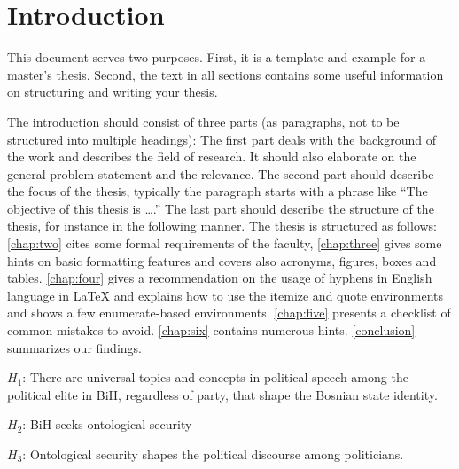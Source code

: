 \chapter{Introduction}
\label{chap:one}

This document serves two purposes. First, it is a template and example for a master's thesis. Second, the text in all sections contains some useful information on structuring and writing your thesis.

The introduction should consist of three parts (as paragraphs, not to be structured into multiple headings): The first part deals with the background of the work and describes the field of research. It should also elaborate on the general problem statement and the relevance. The second part should describe the focus of the thesis, typically the paragraph starts with a phrase like ``The objective of this thesis is \ldots.'' The last part should describe the structure of the thesis, for instance in the following manner. The thesis is structured as follows: \autoref{chap:two} cites some formal requirements of the faculty, \autoref{chap:three} gives some hints on basic formatting features and covers also acronyms, figures, boxes and tables. \autoref{chap:four} gives a recommendation on the usage of hyphens in English language in \LaTeX{} and explains how to use the itemize and quote environments and shows a few enumerate-based environments. \autoref{chap:five} presents a checklist of common mistakes to avoid. \autoref{chap:six} contains numerous hints. \autoref{conclusion} summarizes our findings.



\begin{description}
    \item $H_1$: There are universal topics and concepts in political speech among the political elite in \ac{BiH}, regardless of party, that shape the Bosnian state identity. \label{hyp:one}
    \item $H_2$: \ac{BiH} seeks ontological security \label{hyp:two}
    \item $H_3$: Ontological security shapes the political discourse among politicians. \label{hyp:three}
\end{description}